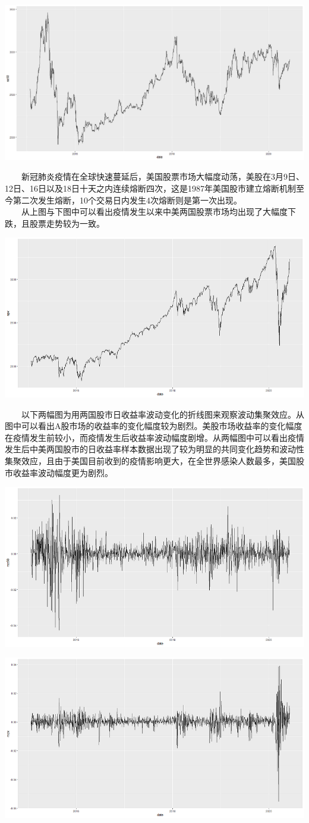 \documentclass[
  11pt,
  letterpaper,
]{article}
\begin{document}
\includegraphics[width=0.7\linewidth]{./5}

  新冠肺炎疫情在全球快速蔓延后，美国股票市场大幅度动荡，美股在3月9日、12日、16日以及18日十天之内连续熔断四次，这是1987年美国股市建立熔断机制至今第二次发生熔断，10个交易日内发生4次熔断则是第一次出现。\\
  从上图与下图中可以看出疫情发生以来中美两国股票市场均出现了大幅度下跌，且股票走势较为一致。

\includegraphics[width=0.7\linewidth]{./6}

  以下两幅图为用两国股市日收益率波动变化的折线图来观察波动集聚效应。从图中可以看出A股市场的收益率的变化幅度较为剧烈。美股市场收益率的变化幅度在疫情发生前较小，而疫情发生后收益率波动幅度剧增。从两幅图中可以看出疫情发生后中美两国股市的日收益率样本数据出现了较为明显的共同变化趋势和波动性集聚效应，且由于美国目前收到的疫情影响更大，在全世界感染人数最多，美国股市收益率波动幅度更为剧烈。

\includegraphics[width=0.7\linewidth]{./7}

\includegraphics[width=0.7\linewidth]{./8}
\end{document}
